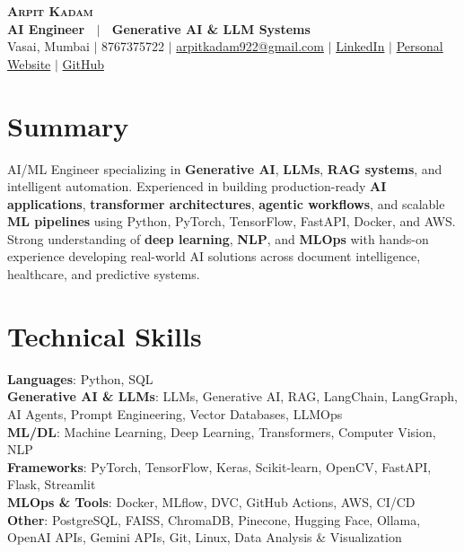 \documentclass[letterpaper,10.5pt]{article}
\begin{document}
\begin{center}
    \textbf{\Huge \scshape Arpit Kadam} \\ \vspace{2pt}
    \textbf{\small AI Engineer \ $|$ \ Generative AI \& LLM Systems} \\ \vspace{4pt}
    \small Vasai, Mumbai $|$ 8767375722 $|$
    \href{mailto:arpitkadam922@gmail.com}{arpitkadam922@gmail.com} $|$
    \href{https://www.linkedin.com/in/arpitkadam/}{LinkedIn} $|$
    \href{https://arpitkadam.online/}{Personal Website} $|$
    \href{https://github.com/ArpitKadam}{GitHub}
\end{center}

\section{Summary}
\small{AI/ML Engineer specializing in \textbf{Generative AI}, \textbf{LLMs}, \textbf{RAG systems}, and intelligent automation. Experienced in building production-ready \textbf{AI applications}, \textbf{transformer architectures}, \textbf{agentic workflows}, and scalable \textbf{ML pipelines} using Python, PyTorch, TensorFlow, FastAPI, Docker, and AWS. Strong understanding of \textbf{deep learning}, \textbf{NLP}, and \textbf{MLOps} with hands-on experience developing real-world AI solutions across document intelligence, healthcare, and predictive systems.}

\section{Technical Skills}
 \begin{itemize}[leftmargin=0.15in, label={}]
    \small{\item{
     \textbf{Languages}{: Python, SQL} \\
     \textbf{Generative AI \& LLMs}{: LLMs, Generative AI, RAG, LangChain, LangGraph, AI Agents, Prompt Engineering, Vector Databases, LLMOps} \\
     \textbf{ML/DL}{: Machine Learning, Deep Learning, Transformers, Computer Vision, NLP} \\
     \textbf{Frameworks}{: PyTorch, TensorFlow, Keras, Scikit-learn, OpenCV, FastAPI, Flask, Streamlit} \\
     \textbf{MLOps \& Tools}{: Docker, MLflow, DVC, GitHub Actions, AWS, CI/CD} \\
     \textbf{Other}{: PostgreSQL, FAISS, ChromaDB, Pinecone, Hugging Face, Ollama, OpenAI APIs, Gemini APIs, Git, Linux, Data Analysis \& Visualization}
    }}
 \end{itemize}
\end{document}
